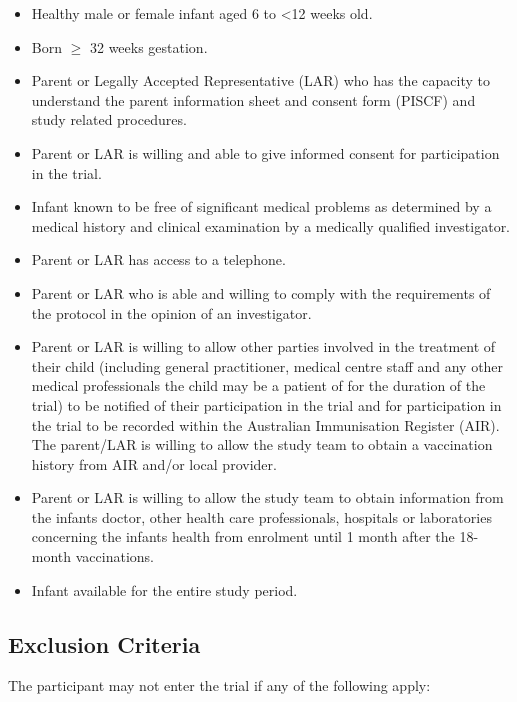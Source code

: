 \documentclass{bmcart}
\begin{document}
\begin{itemize}
	\item Healthy male or female infant aged 6 to \textless12 weeks old.
	\item Born $\geq$ 32 weeks gestation.
	\item
	Parent or Legally Accepted Representative (LAR) who has the capacity to understand the parent information sheet and consent form (PISCF) and study related procedures.
	\item Parent or LAR is willing and able to give informed consent for participation in the trial.
	\item Infant known to be free of significant medical problems as determined by a medical history and clinical examination by a medically qualified investigator.
	\item Parent or LAR has access to a telephone.
	\item Parent or LAR who is able and willing to comply with the requirements of the protocol in the opinion of an investigator.
	\item Parent or LAR is willing to allow other parties involved in the treatment of their child (including general practitioner, medical centre staff and any other medical professionals the child may be a patient of for the duration of the trial) to be notified of their participation in the trial and for participation in the trial to be recorded within the Australian Immunisation Register (AIR). The parent/LAR is willing to allow the study team to obtain a vaccination history from AIR and/or local provider.
	\item Parent or LAR is willing to allow the study team to obtain information from the infants doctor, other health care professionals, hospitals or laboratories concerning the infants health from enrolment until 1 month after the 18-month vaccinations.
	\item Infant available for the entire study period.
\end{itemize}


\subsection*{Exclusion Criteria}

The participant may not enter the trial if any of the following apply:
\end{document}

